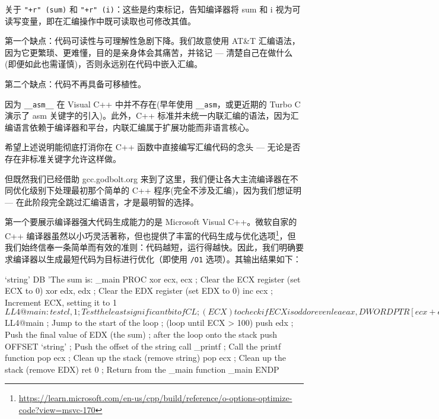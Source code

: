 关于 \verb|"+r" (sum)| 和 \verb|"+r" (i)|：这些是约束标记，告知编译器将 sum 和 i 视为可读写变量，即在汇编操作中既可读取也可修改其值。

第一个缺点：代码可读性与可理解性急剧下降。我们故意使用 AT\&T 汇编语法，因为它更繁琐、更难懂，目的是亲身体会其痛苦，并铭记 --- 清楚自己在做什么(即便如此也需谨慎)，否则永远别在代码中嵌入汇编。

第二个缺点：代码不再具备可移植性。

因为 \verb|__asm__| 在 Visual C++ 中并不存在(早年使用 \verb|__asm|，或更近期的 Turbo C 演示了 asm 关键字的引入)。此外，C++ 标准并未统一内联汇编的语法，因为汇编语言依赖于编译器和平台，内联汇编属于扩展功能而非语言核心。

希望上述说明能彻底打消你在 C++ 函数中直接编写汇编代码的念头 --- 无论是否存在非标准关键字允许这样做。

但既然我们已经借助 gcc.godbolt.org 来到了这里，我们便让各大主流编译器在不同优化级别下处理最初那个简单的 C++ 程序(完全不涉及汇编)，因为我们想证明 --- 在此阶段完全跳过汇编语言，才是最明智的选择。

第一个要展示编译器强大代码生成能力的是 Microsoft Visual C++。微软自家的 C++ 编译器虽然以小巧灵活著称，但也提供了丰富的代码生成与优化选项\footnote{\url{https://learn.microsoft.com/en-us/cpp/build/reference/o-options-optimize-code?view=msvc-170}}，但我们始终信奉一条简单而有效的准则：代码越短，运行得越快。因此，我们明确要求编译器以生成最短代码为目标进行优化（即使用 \verb|/O1| 选项）。其输出结果如下：

\begin{shell}
`string' DB 'The sum is: %
_main PROC
  xor ecx, ecx  ; Clear the ECX register (set ECX to 0)
  xor edx, edx  ; Clear the EDX register (set EDX to 0)
  inc ecx       ; Increment ECX, setting it to 1
  $LL4@main:
  test cl, 1    ; Test the least significant bit of CL
                ; (ECX) to check if ECX is odd or even
  lea eax, DWORD PTR [ecx+edx] ; Load the effective
                ; address of ECX + EDX into EAX
  cmove eax, edx; If the zero flag is set
                ; (ECX was even), move EDX into EAX
  inc ecx       ; Increment ECX by 1
  mov edx, eax  ; Move the value in EAX to EDX
                ; (update EDX for the next iteration)
  cmp ecx, 100  ; Compare ECX with 100
  jle SHORT $LL4@main ; Jump to the start of the loop
                ; (loop until ECX > 100)
  push edx      ; Push the final value of EDX (the sum)
                ; after the loop onto the stack
  push OFFSET `string' ; Push the offset of the string
  call _printf  ; Call the printf function
  pop ecx       ; Clean up the stack (remove string)
  pop ecx       ; Clean up the stack (remove EDX)
  ret 0         ; Return from the _main function
_main ENDP
\end{shell}

